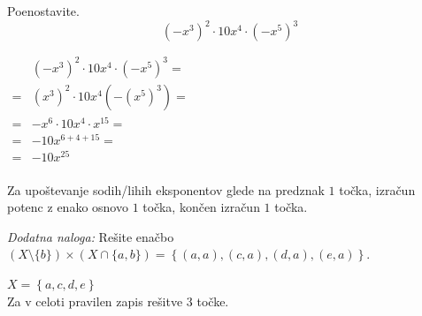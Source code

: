 \documentclass[addpoints,12pt]{exam}
\begin{document}
\begin{questions}
    \newpage
    \question[3]
    Poenostavite. $$ \left(-x^3\right)^2\cdot 10x^4\cdot\left(-x^5\right)^3$$

    \begin{solution}[9cm]
            $\begin{aligned}
                &\left(-x^3\right)^2\cdot 10x^4\cdot\left(-x^5\right)^3= \\
                    =& (x^3)^2\cdot 10x^4(-(x^5)^3)=\\
                    =& -x^6\cdot 10x^4\cdot x^{15}= \\
                    =& -10x^{6+4+15}= \\
                    =& -10x^{25}
            \end{aligned} $ \\ \\
            Za upoštevanje sodih/lihih eksponentov glede na predznak $1$ točka, izračun potenc z enako osnovo $1$ točka, končen izračun $1$ točka.
    \end{solution}


    \newpage
    \bonusquestion[3]
    \textit{Dodatna naloga:} Rešite enačbo $(X\setminus\{b\})\times(X \cap \{a,b\})=\left\{(a,a),(c,a),(d,a),(e,a)\right\}$.

    \begin{solution}
        $X=\left\{a,c,d,e\right\}$ \\
        Za v celoti pravilen zapis rešitve $3$ točke.
    \end{solution}


\end{questions}
\end{document}
